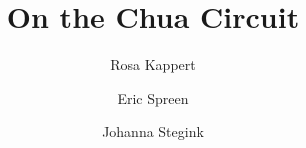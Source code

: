 \documentclass[twocolumn,10pt]{article}
\title{On the Chua Circuit}
\author{Rosa Kappert \and Eric Spreen \and Johanna Stegink}
\begin{document}
\maketitle





\onecolumn
\appendix
\newpage
\end{document}
